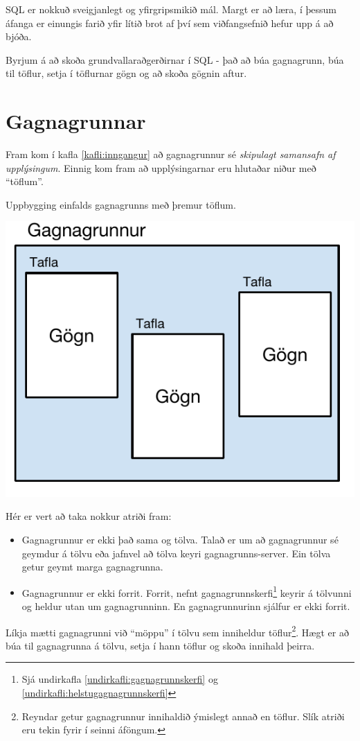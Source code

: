 SQL er nokkuð sveigjanlegt og yfirgripsmikið mál. 
Margt er að læra, í þessum áfanga er einungis farið yfir lítið brot af því sem viðfangsefnið hefur upp á að bjóða.

Byrjum á að skoða grundvallaraðgerðirnar í SQL - það að búa gagnagrunn, búa til töflur, setja í töflurnar gögn og að skoða gögnin aftur.
\section{Gagnagrunnar}
Fram kom í kafla \ref{kafli:inngangur} að gagnagrunnur sé \emph{skipulagt samansafn af upplýsingum}. Einnig kom fram að upplýsingarnar eru hlutaðar niður með ``töflum''.
\begin{marginfigure}
\caption[Uppbygging gagnagrunns]{Uppbygging einfalds gagnagrunns með þremur töflum.}
\label{mynd:uppbygginggagnagrunns}
\centering
\includegraphics[width=\linewidth]{myndir/uppbygging-gagnagrunns}
\end{marginfigure}
Hér er vert að taka nokkur atriði fram:
\begin{itemize}
 \item Gagnagrunnur er ekki það sama og tölva. Talað er um að gagnagrunnur sé geymdur á tölvu eða jafnvel að tölva keyri gagnagrunns-server. Ein tölva getur geymt marga gagnagrunna.
 \item Gagnagrunnur er ekki forrit. Forrit, nefnt gagnagrunnskerfi\footnote{Sjá undirkafla \ref{undirkafli:gagnagrunnskerfi} og \ref{undirkafli:helstugagnagrunnskerfi}} keyrir á tölvunni og heldur utan um gagnagrunninn. En gagnagrunnurinn sjálfur er ekki forrit.
\end{itemize}
Líkja mætti gagnagrunni við ``möppu'' í tölvu sem inniheldur töflur\footnote{Reyndar getur gagnagrunnur innihaldið ýmislegt annað en töflur. Slík atriði eru tekin fyrir í seinni áföngum.}. Hægt er að búa til gagnagrunna á tölvu, setja í hann töflur og skoða innihald þeirra.

